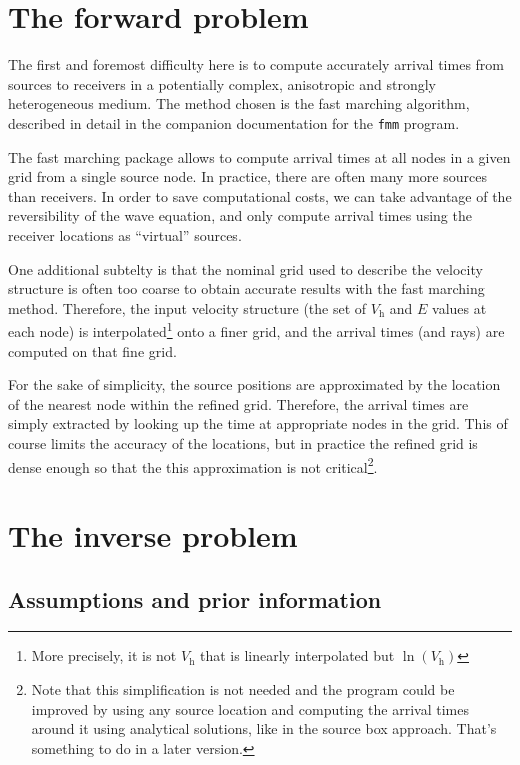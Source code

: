 \documentclass{article}
\begin{document}
\section{The forward problem}

The first and foremost difficulty here is to compute accurately arrival times from sources to receivers in a potentially complex, anisotropic and strongly heterogeneous medium. The method chosen is the fast marching algorithm, described in detail in the companion documentation for the \verb+fmm+ program.

The fast marching package allows to compute arrival times at all nodes in a given grid from a single source node. In practice, there are often many more sources than receivers. In order to save computational costs, we can take advantage of the reversibility of the wave equation, and only compute arrival times using the receiver locations as ``virtual'' sources.

One additional subtelty is that the nominal grid used to describe the velocity structure is often too coarse to obtain accurate results with the fast marching method. Therefore, the input velocity structure (the set of $V_\mathrm{h}$ and $E$ values at each node) is interpolated\footnote{More precisely, it is not $V_\mathrm{h}$ that is linearly interpolated but $\ln(V_\mathrm{h})$} onto a finer grid, and the arrival times (and rays) are computed on that fine grid.

For the sake of simplicity, the source positions are approximated by the location of the nearest node within the refined grid. Therefore, the arrival times are simply extracted by looking up the time at appropriate nodes in the grid. This of course limits the accuracy of the locations, but in practice the refined grid is dense enough so that the this approximation is not critical\footnote{Note that this simplification is not needed and the program could be improved by using any source location and computing the arrival times around it using analytical solutions, like in the source box approach. That's something to do in a later version.}.

\section{The inverse problem}

\subsection{Assumptions and prior information}
\end{document}
